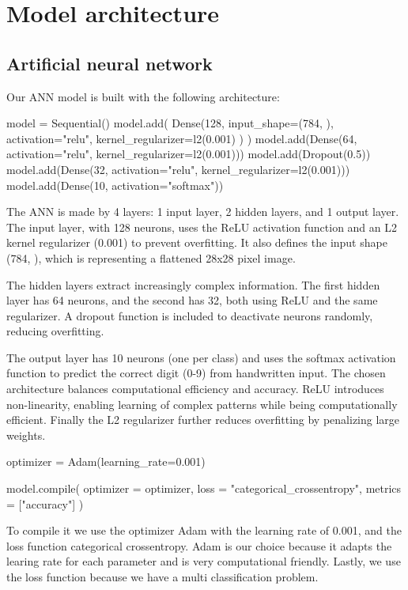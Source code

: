 \section{Model architecture}

\subsection{Artificial neural network}
Our ANN model is built with the following architecture:
\begin{python}
model = Sequential()
model.add( 
         Dense(128, 
               input_shape=(784, ),
               activation="relu", 
               kernel_regularizer=l2(0.001)
               )
          )
model.add(Dense(64, activation="relu", kernel_regularizer=l2(0.001)))
model.add(Dropout(0.5))
model.add(Dense(32, activation="relu", kernel_regularizer=l2(0.001)))
model.add(Dense(10, activation="softmax"))
\end{python}
The ANN is made by 4 layers: 1 input layer, 2 hidden layers, and 1 output layer. 
The input layer, with 128 neurons, uses the ReLU activation function and an L2 kernel regularizer (0.001) to prevent overfitting.
It also defines the input shape (784, ), which is representing a flattened 28x28 pixel image.
\par
The hidden layers extract increasingly complex information. 
The first hidden layer has 64 neurons, and the second has 32, both using ReLU and the same regularizer. 
A dropout function is included to deactivate neurons randomly, reducing overfitting.
\par
The output layer has 10 neurons (one per class) and uses the softmax activation function to predict the correct digit (0-9) from handwritten input.
The chosen architecture balances computational efficiency and accuracy. ReLU introduces non-linearity, enabling learning of complex patterns while being computationally efficient. 
Finally the L2 regularizer further reduces overfitting by penalizing large weights.

\begin{python}
optimizer = Adam(learning_rate=0.001)

model.compile(
    optimizer = optimizer, 
    loss = "categorical_crossentropy", 
    metrics = ["accuracy"]
)
\end{python}
To compile it we use the optimizer Adam with the learning rate of 0.001, and the loss function categorical crossentropy.
Adam is our choice because it adapts the learing rate for each parameter and is very computational friendly.
Lastly, we use the loss function because we have a multi classification problem.

